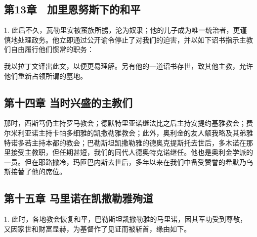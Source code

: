 
\subsection{第13章　加里恩努斯下的和平}

1. 此后不久，瓦勒里安被蛮族所掳，沦为奴隶；他的儿子成为唯一统治者，更谨慎地处理政务。他立即通过公开谕令停止了对我们的迫害，并以如下诏书指示主教们自由履行他们惯常的职务：\par

\par

我以拉丁文译出此文，以便更易理解。另有他的一道诏书存世，致其他主教，允许他们重新占领所谓的墓地。\par


\subsection{第十四章 当时兴盛的主教们}

那时，西斯笃仍主持罗马教会；德默特里亚诺继法比之后主持安提约基雅教会；费尔米利亚诺主持卡帕多细雅的凯撒勒雅教会；此外，奥利金的友人额我略及其弟雅特诺多若主持本都的教会；巴勒斯坦凯撒勒雅的德奥克提斯托去世后，多木诺在那里接受主教职，但任期甚短，我们的同代人德奥特克诺继任。他也是奥利金学派的一员。但在耶路撒冷，玛匝巴内斯去世后，多年以来在我们中备受赞誉的希默乃乌斯接替了他的席位。\par


\subsection{第十五章 马里诺在凯撒勒雅殉道}

1. 此时，各地教会恢复和平，巴勒斯坦凯撒勒雅的马里诺，因其军功受到尊敬，又因家世和财富显赫，为基督作了见证而被斩首，缘由如下。\par

